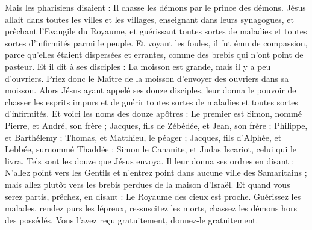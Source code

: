 \begin{multicols}{2}
Mais les pharisiens disaient : Il chasse les démons par le prince des démons.
Jésus allait dans toutes les villes et les villages, enseignant dans leurs synagogues, et prêchant l'Evangile du Royaume, et guérissant toutes sortes de maladies et toutes sortes d'infirmités parmi le peuple.
Et voyant les foules, il fut ému de compassion, parce qu'elles étaient dispersées et errantes, comme des brebis qui n'ont point de pasteur.
Et il dit à ses disciples : La moisson est grande, mais il y a peu d'ouvriers.
Priez donc le Maître de la moisson d'envoyer des ouvriers dans sa moisson.
\VerseOne{}Alors Jésus ayant appelé ses douze disciples, leur donna le pouvoir de chasser les esprits impurs et de guérir toutes sortes de maladies et toutes sortes d'infirmités.
Et voici les noms des douze apôtres : Le premier est Simon, nommé Pierre, et André, son frère ; Jacques, fils de Zébédée, et Jean, son frère ;
Philippe, et Barthélemy ; Thomas, et Matthieu, le péager ; Jacques, fils d'Alphée, et Lebbée, surnommé Thaddée ;
Simon le Cananite, et Judas Iscariot, celui qui le livra.
Tels sont les douze que Jésus envoya. Il leur donna ses ordres en disant : N'allez point vers les Gentils et n'entrez point dans aucune ville des Samaritains ;
mais allez plutôt vers les brebis perdues de la maison d'Israël.
Et quand vous serez partis, prêchez, en disant : Le Royaume des cieux est proche.
Guérissez les malades, rendez purs les lépreux, ressuscitez les morts, chassez les démons hors des possédés. Vous l'avez reçu gratuitement, donnez-le gratuitement.

\end{multicols}
